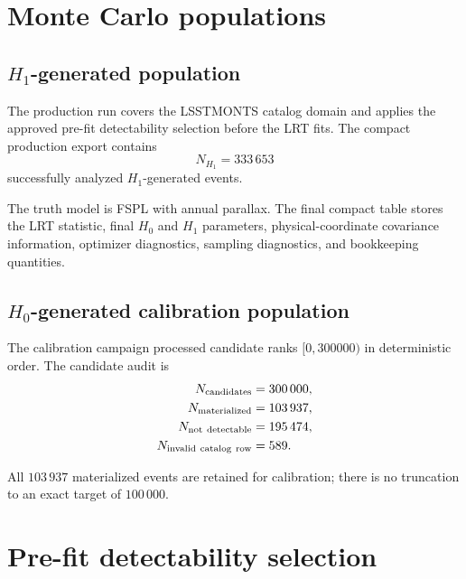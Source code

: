 \documentclass[11pt,a4paper]{article}
\newcommand{\Hnull}{H_0}
\newcommand{\Halt}{H_1}
\begin{document}
\section{Monte Carlo populations}

\subsection{$\Halt$-generated population}

The production run covers the LSSTMONTS catalog domain and applies the approved pre-fit
detectability selection before the LRT fits. The compact production export contains
\begin{equation}
    N_{\Halt}=333\,653
\end{equation}
successfully analyzed $\Halt$-generated events.

The truth model is FSPL with annual parallax. The final compact table stores the LRT statistic,
final $\Hnull$ and $\Halt$ parameters, physical-coordinate covariance information, optimizer
diagnostics, sampling diagnostics, and bookkeeping quantities.

\subsection{$\Hnull$-generated calibration population}

The calibration campaign processed candidate ranks $[0,300000)$ in deterministic order.
The candidate audit is
\begin{align}
    N_{\rm candidates} &= 300\,000,\\
    N_{\rm materialized} &= 103\,937,\\
    N_{\rm not\ detectable} &= 195\,474,\\
    N_{\rm invalid\ catalog\ row} &= 589.
\end{align}

All $103\,937$ materialized events are retained for calibration; there is no truncation to an
exact target of $100\,000$.

\section{Pre-fit detectability selection}
\end{document}
